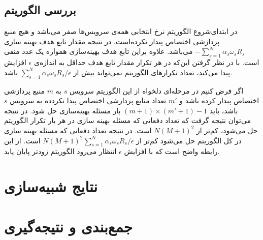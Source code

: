     \subsection{بررسی الگوریتم}
      در ابتدای‌شروع الگوریتم نرخ انتخابی همه‌ی سرویس‌ها صفر می‌باشد و هیچ منبع پردازشی اختصاص پیدار نکرده‌است.
      در نتیجه مقدار تابع هدف بهینه سازی $-\sum_{s=1}^N \alpha_s \omega_s R_s$ می‌باشد.
      علاوه براین تابع هدف بهینه‌سازی همواره یک عدد منفی است.
      با در نظر گرفتن این‌که در هر تکرار مقدار تابع هدف حداقل به اندازه‌ی $\epsilon$ افزایش پیدا می‌کند، تعداد تکرار‌های الگوریتم نمی‌تواند بیش از $\sum_{s=1}^N  \alpha_s \omega_s R_s / \epsilon$  باشد.
      
      اگر فرض کنیم در مرحله‌ای دلخواه از این الگوریتم سرویس $s$ به $m$ منبع پردازشی اختصاص پیدار کرده باشد و $m'$ تعداد منابع پردازشی اختصاص پیدا نکردده به سرویس $s$ باشد، باید $(m+1) \times (m'+1) - 1$ بار مسئله بهینه‌سازی حل شود.
      در نتیجه می‌توان نتیجه گرفت که تعداد دفعاتی که مسئله بهینه سازی در هر بار تکرار الگوریتم حل می‌شود، کم‌تر از $N(M+1)^2$ است.
      در نتیجه تعداد دفعاتی که مسئله بهینه سازی در کل الگوریتم حل می‌شود کم‌تر از $N(M+1)^2 \sum_{s=1}^N  \alpha_s \omega_s R_s / \epsilon$ است.
      از این رابطه واضح است که با افزایش $\epsilon$ انتظار می‌رود الگوریتم زود‌تر پایان یابد.

  \section{نتایج شبیه‌سازی}
  \section{جمع‌بندی و نتیجه‌گیری}
    